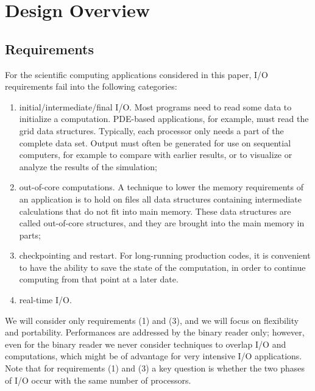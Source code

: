 \documentclass[11pt,relax]{SANDreport}
\begin{document}
\section{Design Overview}
\label{sec:design}

\subsection{Requirements}

For the scientific computing applications considered in this paper, I/O
requirements fail into the following categories:
\begin{enumerate}
\item initial/intermediate/final I/O. Most programs need to read some data to
initialize a computation. PDE-based applications, for example, must read the
grid data structures. Typically, each processor only needs a part of the
complete data set. Output must often be generated for use on sequential
computers, for example to compare with earlier results, or to visualize or
analyze the results of the simulation;
\item out-of-core computations. A technique to lower the memory requirements
of an application is to hold on files all data structures containing
intermediate calculations that do not fit into main memory. These data
structures are called out-of-core structures, and they are brought into the
main memory in parts;
\item checkpointing and restart. For long-running production codes, it is
convenient to have the ability to save the state of the computation, in order
to continue computing from that point at a later date.
\item real-time I/O.
\end{enumerate}
We will consider only requirements (1) and (3), and we will focus on
flexibility and portability. Performances are addressed by the binary reader
only; however, even for the binary reader we never consider techniques to
overlap I/O and computations, which
might be of advantage for very intensive I/O applications. Note that for
requirements (1) and (3) a key question is whether the two phases of I/O occur
with the same number of processors.

\end{document}
